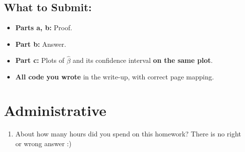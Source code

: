 \documentclass{article}
\begin{document}
\begin{bprob}
    \subsection*{What to Submit:}
    \begin{itemize}
        \item \textbf{Parts a, b:} Proof.
        \item \textbf{Part b:} Answer.
        \item \textbf{Part c:} Plots of $\hat{\beta}$ and its confidence interval \textbf{on the same plot}.
        \item \textbf{All code you wrote} in the write-up, with correct page mapping.
    \end{itemize}
\end{bprob}

\section*{Administrative}
\begin{aprob}
\begin{enumerate}
    \item {} About how many hours did you spend on this homework? There is no right or wrong answer :)
\end{enumerate}
\end{aprob}
\end{document}

